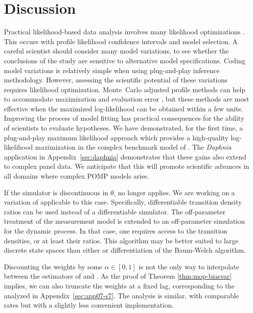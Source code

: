 \section{Discussion}

Practical likelihood-based data analysis involves many likelihood optimizations \citep{king08,blake14,pons-salort18,subramanian21,fox22,drake23}.
This occurs with profile likelihood confidence intervals and model selection. A careful scientist should consider many model variations, to see whether the conclusions of the study are sensitive to alternative model specifications.
Coding model variations is relatively simple when using plug-and-play inference methodology.
However, assessing the scientific potential of these variations requires likelihood optimization.
Monte~Carlo adjusted profile methods can help to accommodate maximization and evaluation error \citep{ionides17,ning21}, but these methods are most effective when the maximized log-likelihood can be obtained within a few units.
Improving the process of model fitting has practical consequences for the ability of scientists to evaluate hypotheses.
We have demonstrated, for the first time, a plug-and-play maximum likelihood approach which provides a high-quality log-likelihood maximization in the complex benchmark model of \cite{king08}.
The \textit{Daphnia} application in Appendix~\ref{sec:daphnia} demonstrates that these gains also extend to complex panel data.
We anticipate that this will promote scientific advances in all domains where complex POMP models arise.


If the simulator is discontinuous in $\theta$,  no longer applies.
We are working on a variation of  applicable to this case.
Specifically, differentiable transition density ratios can be used instead of a differentiable simulator.
The off-parameter treatment of the measurement model is extended to an off-parameter simulation for the dynamic process.
In that case, one requires access to the transition densities, or at least their ratios. 
This algorithm may be better suited to large discrete state spaces than either  or differentiation of the Baum-Welch algorithm.

Discounting the weights by some $\alpha \in [0,1]$ is not the only way to interpolate between the estimators of \cite{naesseth18} and \cite{poyiadjis11}. 
As the proof of Theorem \ref{thm:mop-biasvar} implies, we can also truncate the weights at a fixed lag, corresponding to the  analyzed in Appendix~\ref{sec:app07-s7}. 
The analysis is similar, with comparable rates but with a slightly less convenient implementation. 



